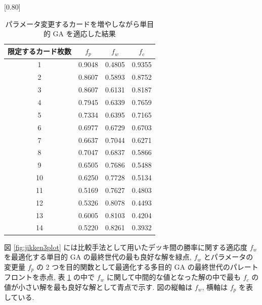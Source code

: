 \documentclass[12pt]{jarticle}
\begin{document}
\begin{table}[t]
  \centering
  \caption{パラメータ変更するカードを増やしながら単目的 GA を適応した結果}
  \label{jikken3result}
  \scalebox{0.80}[0.80]{
    \begin{tabular}{|c|c|c|c|}
      \hline
      限定するカード枚数     & $f_p$ & $f_w$ & $f_c$\\ \hline \hline
      1              & 0.9048         & 0.4805 & 0.9355  \\ \hline
      2           & 0.8607         & 0.5893 & 0.8752 \\ \hline
      3        & 0.8607         & 0.6131 & 0.8187  \\ \hline
      4    & 0.7945         & 0.6339 & 0.7659 \\ \hline
      5 & 0.7334         & 0.6395  & 0.7165 \\ \hline
      6 & 0.6977      & 0.6729  & 0.6703 \\ \hline
      7& 0.6637   & 0.7044  & 0.6271 \\ \hline
      8 & 0.7047 & 0.6837 & 0.5866 \\ \hline
      9 & 0.6505 & 0.7686 & 0.5488\\ \hline
      10 & 0.6250 & 0.7728  & 0.5134\\ \hline
      11 & 0.5169 & 0.7627 & 0.4803\\ \hline
      12 & 0.5326 & 0.8078 & 0.4493\\ \hline
      13 & 0.6005 & 0.8103 & 0.4204\\ \hline
      14 &  0.5220 &  0.8261 & 0.3932\\ \hline
      \end{tabular}
  }
  
  \end{table}
図 \ref{fig:jikken3plot} には比較手法として用いたデッキ間の勝率に関する適応度 $f_w$ を最適化する単目的 GA の最終世代の最も良好な解を緑点, $f_w$ とパラメータの変更量 $f_p$ の 2 つを目的関数として最適化する多目的 GA の最終世代のパレートフロントを赤点, 表 \ref{jikken3result} の中で $f_w$ に関して中間的な値となった解の中で最も $f_c$ の値が小さい解を最も良好な解として青点で示す. 図の縦軸は $f_w$, 横軸は $f_p$ を表している. 
\end{document}
